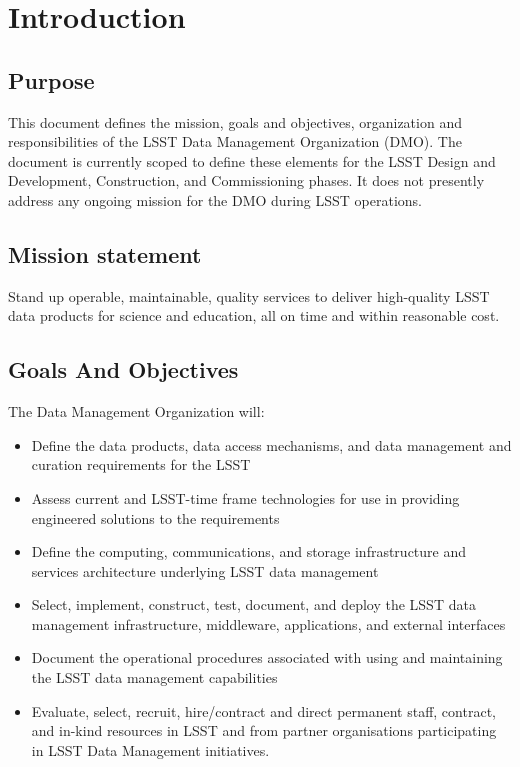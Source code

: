 \section{Introduction}
\subsection{Purpose}
This document defines the mission, goals and objectives, organization and responsibilities of the LSST Data Management Organization (DMO).  The document is currently scoped to define these elements for the LSST Design and Development, Construction, and Commissioning phases.  It does not presently address any ongoing mission for the DMO during LSST operations.

\subsection{Mission statement}
Stand up operable, maintainable, quality services to deliver high-quality LSST data products for science and education, all on time and within reasonable cost.

\subsection{Goals And Objectives}
The Data Management Organization will:
\begin{itemize}
\item Define the data products, data access mechanisms, and data management and curation requirements for the LSST
\item Assess current and LSST-time frame technologies for use in providing engineered solutions to the requirements
\item Define the computing, communications, and storage infrastructure and services architecture underlying LSST data management
\item Select, implement, construct, test, document, and deploy the LSST data management infrastructure, middleware, applications, and external interfaces
\item Document the operational procedures associated with using and maintaining the LSST data management capabilities
\item Evaluate, select, recruit, hire/contract and direct permanent staff, contract, and in-kind resources in LSST and from partner organisations participating in LSST Data Management initiatives.

\end{itemize}


